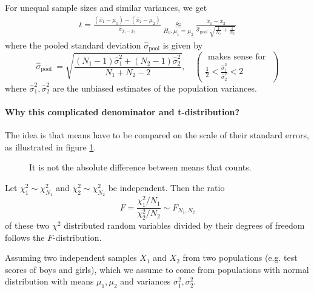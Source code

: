 For unequal sample sizes and similar variances, we get
\begin{equation}
    \begin{gathered}
        t=\frac{\left(\bar{x}_1-\mu_1\right)-\left(\bar{x}_2-\mu_2\right)}{\hat{\sigma}_{\bar{x}_1-\bar{x}_2}} \underset{H_0: \mu_1 = \mu_2}{\approxeq} \frac{\bar{x}_1-\bar{x}_2}{\hat{\sigma}_{\text {pool }} \sqrt{\frac{1}{N_1}+\frac{1}{N_2}}}
    \end{gathered}
\end{equation}
where the pooled standard deviation $\hat{\sigma}_{\text{pool}}$ is given by
\begin{equation}
    \hat{\sigma}_{\text {pool }}=\sqrt{\frac{\left(N_1-1\right) \hat{\sigma}_1^2+\left(N_2-1\right) \hat{\sigma}_2^2}{N_1+N_2-2}},\quad \left(\begin{array}{c}
    \text { makes sense for } \\
    \frac{1}{2}<\frac{\hat{\sigma}_1^2}{\hat{\sigma}_2^2}<2
    \end{array}\right)
\end{equation}
where $\hat{\sigma}_1^2, \hat{\sigma}_2^2$ are the unbiased estimates of the population variances.

\paragraph*{Why this complicated denominator and t-distribution?} The idea is that means have to be
compared on the scale of their standard errors, as illustrated in figure \ref{fig:means_diff_std}.

\begin{figure}[!htb]
    \centering
    
    \caption{It is not the absolute difference between means that counts.}
    \label{fig:means_diff_std}
\end{figure}

Let $\chi_1^2 \sim \chi_{N_1}^2$ and $\chi_2^2 \sim \chi_{N_2}^2$ be independent. Then the ratio
\begin{equation}
    F = \frac{\chi_1^2 \slash N_1}{\chi_2^2 \slash N_2} \sim F_{N_1,N_2}
\end{equation}
of these two $\chi^2$ distributed random variables divided by their degrees of freedom follows the $F$-distribution.

Assuming two independent samples $X_1$ and $X_2$ from two populations 
(e.g. test scores of boys and girls), which we assume to come from populations
with normal distribution with means $\mu_1, \mu_2$ and variances $\sigma_1^2, \sigma_2^2$.

